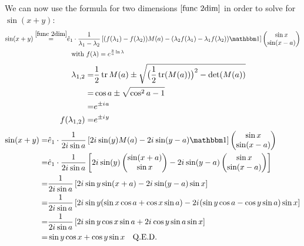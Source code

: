 \documentclass[12pt]{article}
\renewcommand{\i}{{i\mkern1mu}}
\begin{document}
We can now use the formula for two dimensions $\eqref{func 2dim}$ in order to solve for $\sin(x+y)$:
\begin{align}
\sin(x+y) \overset{\eqref{func 2dim}}=& \hat e_1 \cdot \frac 1{\lambda_1 - \lambda_2} \left[(f(\lambda_1) - f(\lambda_2))M(a) - (\lambda_2 f(\lambda_1) - \lambda_1 f(\lambda_2)) \mathbbm 1\right] \begin{pmatrix} \sin x \\ \sin(x-a) \end{pmatrix} \nonumber\\
&\ \ \text{with}\ f(\lambda) = e^{\frac ya \ln\lambda}
\end{align}
\begin{align}
\lambda_{1,2} =& \frac 12\tr M(a) \pm \sqrt{\big(\frac 12\tr (M(a))\big)^2 - \det(M(a))}\nonumber\\
=& \cos a \pm \sqrt{\cos^2 a - 1}\nonumber\\
=& e^{\pm \i a}\\
f(\lambda_{1,2}) =& e^{\pm \i y}
\end{align}
\begin{align}
\sin(x+y) =& \hat e_1 \cdot \frac 1{2\i \sin a} \left[2\i \sin(y) M(a) - 2\i \sin(y - a) \mathbbm 1\right] \begin{pmatrix} \sin x \\ \sin(x-a) \end{pmatrix} \nonumber\\
=& \hat e_1 \cdot \frac 1{2\i \sin a} \left[2\i \sin(y)  \begin{pmatrix} \sin(x+a) \\ \sin x \end{pmatrix} - 2\i \sin(y - a) \begin{pmatrix} \sin x \\ \sin(x-a) \end{pmatrix} \right] \nonumber\\
=& \frac 1{2\i \sin a} \left[2\i \sin y \sin(x+a) - 2\i \sin(y - a) \sin x \right] \nonumber\\
=& \frac 1{2\i \sin a} \left[2\i \sin y (\sin x \cos a + \cos x \sin a) - 2\i (\sin y \cos a - \cos y \sin a) \sin x \right] \nonumber\\
=& \frac 1{2\i \sin a} \left[2\i \sin y \cos x \sin a + 2\i \cos y \sin a \sin x \right] \nonumber\\
=& \sin y \cos x + \cos y \sin x\ \ \ \text{Q.E.D.}
\end{align}
\end{document}
